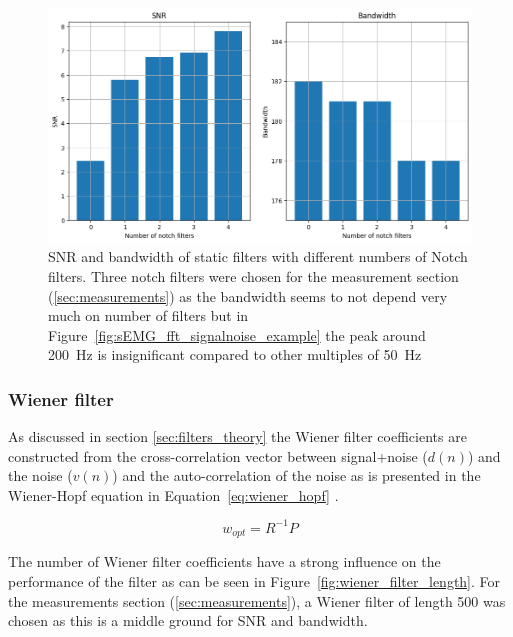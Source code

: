 \begin{figure}[h!t]
	\begin{center}
		\includegraphics[width=1.0\columnwidth]{images/staticfilter_notches_barchart.png}
	\end{center}
	\caption{SNR and bandwidth of static filters with different numbers of Notch filters. Three notch filters were chosen for the measurement section (\ref{sec:measurements}) as the bandwidth seems to not depend very much on number of filters but in Figure~\ref{fig:sEMG_fft_signalnoise_example} the peak around \SI{200}{\hertz} is insignificant compared to other multiples of \SI{50}{\hertz}}
	\label{fig:staticfilter_notches_barchart}
\end{figure}


\subsubsection{Wiener filter}
As discussed in section \ref{sec:filters_theory} the Wiener filter coefficients are constructed from the cross-correlation vector between signal+noise ($d(n)$) and the noise ($v(n)$) and the auto-correlation of the noise as is presented in the Wiener-Hopf equation in Equation~\ref{eq:wiener_hopf} \cite{lecture_adaptive_filters_1}. 

\begin{equation}
    w_{opt} = R^{-1}P
    \label{eq:wiener_hopf}
\end{equation}

The number of Wiener filter coefficients have a strong influence on the performance of the filter as can be seen in Figure~\ref{fig:wiener_filter_length}. For the measurements section (\ref{sec:measurements}), a Wiener filter of length 500 was chosen as this is a middle ground for SNR and bandwidth.

